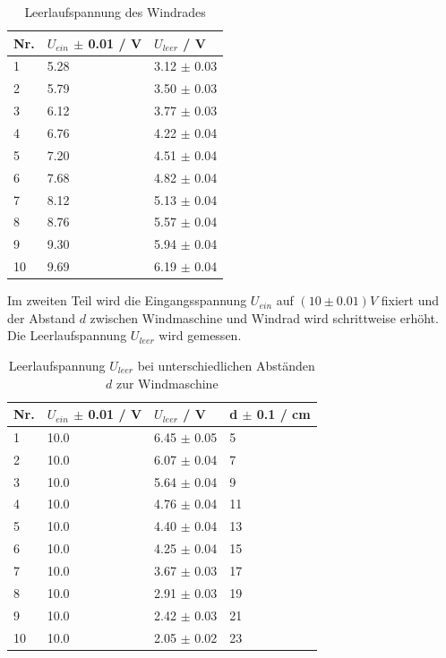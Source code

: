 \documentclass[12pt,a4paper,twoside]{article}
\begin{document}
\begin{table}[H]
    \centering
    \caption{Leerlaufspannung des Windrades}
    \label{tab:Messdaten Windkraft stationär}
    \begin{tabular}{| l | l | l |}
        \hline
        Nr. & $U_{ein} $ $\pm$ 0.01 / V & $U_{leer}$ / V \\
        \hline
        1  & 5.28  & 3.12 $\pm$ 0.03  \\
        2  & 5.79  & 3.50 $\pm$ 0.03  \\
        3  & 6.12  & 3.77 $\pm$ 0.03    \\
        4  & 6.76  & 4.22 $\pm$ 0.04   \\
        5  & 7.20  & 4.51 $\pm$ 0.04    \\
        6  & 7.68  & 4.82 $\pm$ 0.04   \\
        7  & 8.12  & 5.13 $\pm$ 0.04    \\
        8  & 8.76  & 5.57 $\pm$ 0.04    \\
        9  & 9.30  & 5.94 $\pm$ 0.04   \\
        10 & 9.69  & 6.19 $\pm$ 0.04    \\
        \hline  
    \end{tabular}
\end{table}

\noindent
Im zweiten Teil wird die Eingangsspannung $U_{ein}$ auf $(10 \pm 0.01)V$ fixiert und der Abstand $d$ zwischen Windmaschine und Windrad wird schrittweise erhöht. 
Die Leerlaufspannung $U_{leer}$ wird gemessen. 
\begin{table}[H]
    \centering
    \caption{Leerlaufspannung $U_{leer}$ bei unterschiedlichen Abständen $d$ zur Windmaschine}
    \label{tab:Messdaten Windkraft mit d}
    \begin{tabular}{| l | l | l | l |}
        \hline
        Nr. & $U_{ein} $ $\pm $ 0.01 / V & $U_{leer}$ / V & d $\pm$ 0.1 / cm \\
        \hline
        1  & 10.0  & 6.45 $\pm$ 0.05  & 5 \\
        2  & 10.0  & 6.07 $\pm$ 0.04  & 7 \\
        3  & 10.0  & 5.64 $\pm$ 0.04  & 9 \\
        4  & 10.0  & 4.76 $\pm$ 0.04  & 11 \\
        5  & 10.0  & 4.40 $\pm$ 0.04  & 13 \\
        6  & 10.0  & 4.25 $\pm$ 0.04  & 15 \\
        7  & 10.0  & 3.67 $\pm$ 0.03  & 17 \\
        8  & 10.0  & 2.91 $\pm$ 0.03  & 19 \\
        9  & 10.0  & 2.42 $\pm$ 0.03  & 21 \\
        10 & 10.0  & 2.05 $\pm$ 0.02  & 23 \\
        \hline  
    \end{tabular}
\end{table}
\end{document}
